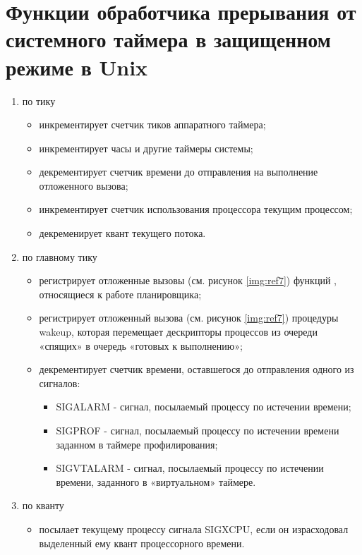 \section{Функции обработчика прерывания от системного таймера в защищенном режиме в Unix}

\begin{enumerate}
	\item по тику
	      \begin{itemize}
		      \item инкрементирует счетчик тиков аппаратного таймера;
		      \item инкрементирует часы и другие таймеры системы;
		      \item декрементирует счетчик времени до отправления на выполнение отложенного вызова;
		      \item инкрементирует счетчик использования процессора текущим процессом;
		      \item декременирует квант текущего потока.
	      \end{itemize}
	\item по главному тику
	      \begin{itemize}
		      \item регистрирует отложенные вызовы (см. рисунок \ref{img:ref7}) функций , относящиеся к работе планировщика;
		      \item регистрирует отложенный вызова (см. рисунок \ref{img:ref7}) процедуры wakeup, которая
		            перемещает дескрипторы процессов из очереди «спящих» в
		            очередь «готовых к выполнению»;
		      \item декрементирует счетчик времени, оставшегося до отправления одного из
		            сигналов: 
		            \begin{itemize}
			            \item SIGALARM - сигнал, посылаемый процессу по истечении времени;
			            \item SIGPROF - сигнал, посылаемый процессу по истечении времени заданном в таймере профилирования;
			            \item SIGVTALARM - сигнал, посылаемый процессу по истечении времени, заданного в «виртуальном» таймере.
		            \end{itemize}
	      \end{itemize}
	\item по кванту
	      \begin{itemize}
		      \item посылает текущему процессу сигнала SIGXCPU, если он
		            израсходовал выделенный ему квант процессорного времени.
	      \end{itemize}
\end{enumerate}

